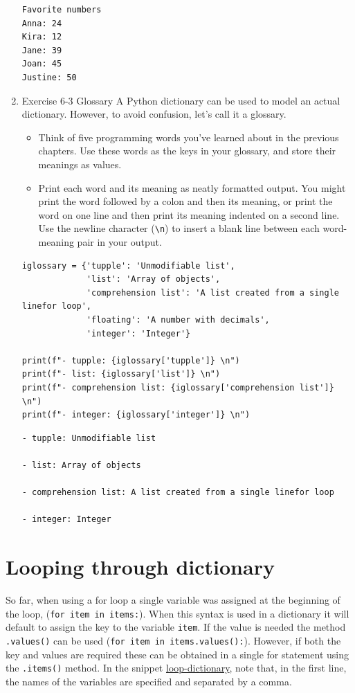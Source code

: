 \documentclass[10pt]{book}
\begin{document}
\begin{enumerate}
\label{orgd638299}
\begin{verbatim}
Favorite numbers
Anna: 24
Kira: 12
Jane: 39
Joan: 45
Justine: 50
\end{verbatim}
\item Exercise 6-3 Glossary
\label{sec:org32dd5d6}
A Python dictionary can be used to model an actual dictionary. However, to avoid confusion, let’s call it a glossary.
\begin{itemize}
\item Think of five programming words you’ve learned about in the previous chapters. Use these words as the keys in your glossary, and store their meanings as values.
\item Print each word and its meaning as neatly formatted output. You might print the word followed by a colon and then its meaning, or print the word on one line and then print its meaning indented on a second line. Use the newline character (\texttt{\textbackslash{}n}) to insert a blank line between each word-meaning pair in your output.
\end{itemize}
\begin{verbatim}
iglossary = {'tupple': 'Unmodifiable list',
             'list': 'Array of objects',
             'comprehension list': 'A list created from a single linefor loop',
             'floating': 'A number with decimals',
             'integer': 'Integer'}

print(f"- tupple: {iglossary['tupple']} \n")
print(f"- list: {iglossary['list']} \n")
print(f"- comprehension list: {iglossary['comprehension list']} \n")
print(f"- integer: {iglossary['integer']} \n")
\end{verbatim}

\label{org4a58b94}
\begin{verbatim}
- tupple: Unmodifiable list 

- list: Array of objects 

- comprehension list: A list created from a single linefor loop 

- integer: Integer
\end{verbatim}
\end{enumerate}
\section{Looping through dictionary}
\label{sec:org7ba3f90}
So far, when using a for loop a single variable was assigned at the beginning of the loop, (\texttt{for item in items:}). When this syntax is used in a dictionary it will default to assign the key to the variable \texttt{item}. If the value is needed the method \texttt{.values()} can be used (\texttt{for item in items.values():}). However, if both the key and values are required these can be obtained in a single for statement using the \texttt{.items()} method. In the snippet \hyperref[orga413beb]{loop-dictionary}, note that, in the first line, the names of the variables are specified and separated by a comma.
\end{document}
